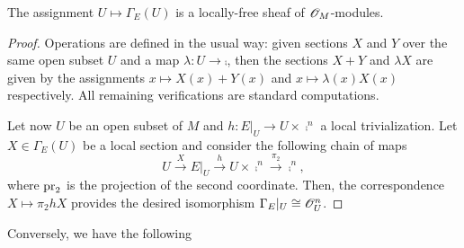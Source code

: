 \begin{theorem}\label{loc_free_sections}
The assignment $U\mapsto \Gamma_E(U)$ is a locally-free sheaf of $\mathscr{O}_M$-modules.
\end{theorem}
\begin{proof}
Operations are defined in the usual way: given sections $X$ and $Y$ over the same open subset $U$ and a map $\lambda :U\to \comp$, then the sections $X+Y$ and $\lambda X$ are given by the assignments $x\mapsto X(x)+Y(x)$ and $x\mapsto \lambda (x)X(x)$ respectively. All remaining verifications are standard computations.

Let now $U$ be an open subset of $M$ and $h:E|_U\to U\times \comp^n$ a local trivialization. Let $X\in \Gamma_E(U)$ be a local section and consider the following chain of maps
$$U\stackrel{X}{\longrightarrow}E|_U\stackrel{h}{\longrightarrow}U\times \comp^n\stackrel{\pi_2}{\longrightarrow}\comp^n,$$
where $\operatorname{pr}_2$ is the projection of the second coordinate. Then, the correspondence $X\mapsto \pi_2hX$ provides the desired isomorphism $\Gamma_E|_U\cong \mathscr{O}_U^n$.
\end{proof}

Conversely, we have the following

